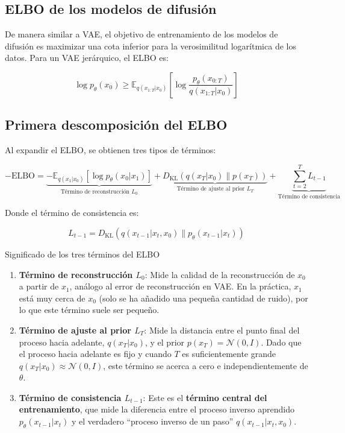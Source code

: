 \documentclass[a4paper]{article}
\begin{document}
\subsection{ELBO de los modelos de difusión}

De manera similar a VAE, el objetivo de entrenamiento de los modelos de difusión es maximizar una cota inferior para la verosimilitud logarítmica de los datos. Para un VAE jerárquico, el ELBO es:

$$\log p_\theta(x_0) \geq \mathbb{E}_{q(x_{1:T}|x_0)} \left[ \log \frac{p_\theta(x_{0:T})}{q(x_{1:T}|x_0)} \right]$$

\subsection{Primera descomposición del ELBO}

Al expandir el ELBO, se obtienen tres tipos de términos:

$$-\text{ELBO} = \underbrace{-\mathbb{E}_{q(x_1|x_0)}[\log p_\theta(x_0|x_1)]}_{\text{Término de reconstrucción } L_0} + \underbrace{D_{\text{KL}}(q(x_T|x_0) \| p(x_T))}_{\text{Término de ajuste al prior } L_T} + \underbrace{\sum_{t=2}^{T} L_{t-1}}_{\text{Término de consistencia}}$$

Donde el término de consistencia es:

$$L_{t-1} = D_{\text{KL}}(q(x_{t-1}|x_t, x_0) \| p_\theta(x_{t-1}|x_t))$$

\begin{importantbox}{Significado de los tres términos del ELBO}
\begin{enumerate}
    \item \textbf{Término de reconstrucción $L_0$}: Mide la calidad de la reconstrucción de $x_0$ a partir de $x_1$, análogo al error de reconstrucción en VAE. En la práctica, $x_1$ está muy cerca de $x_0$ (solo se ha añadido una pequeña cantidad de ruido), por lo que este término suele ser pequeño.
    \item \textbf{Término de ajuste al prior $L_T$}: Mide la distancia entre el punto final del proceso hacia adelante, $q(x_T|x_0)$, y el prior $p(x_T) = \mathcal{N}(0, I)$. Dado que el proceso hacia adelante es fijo y cuando $T$ es suficientemente grande $q(x_T|x_0) \approx \mathcal{N}(0,I)$, este término se acerca a cero e independientemente de $\theta$.
    \item \textbf{Término de consistencia $L_{t-1}$}: Este es el \textbf{término central del entrenamiento}, que mide la diferencia entre el proceso inverso aprendido $p_\theta(x_{t-1}|x_t)$ y el verdadero ``proceso inverso de un paso'' $q(x_{t-1}|x_t, x_0)$.
\end{enumerate}
\end{importantbox}
\end{document}
